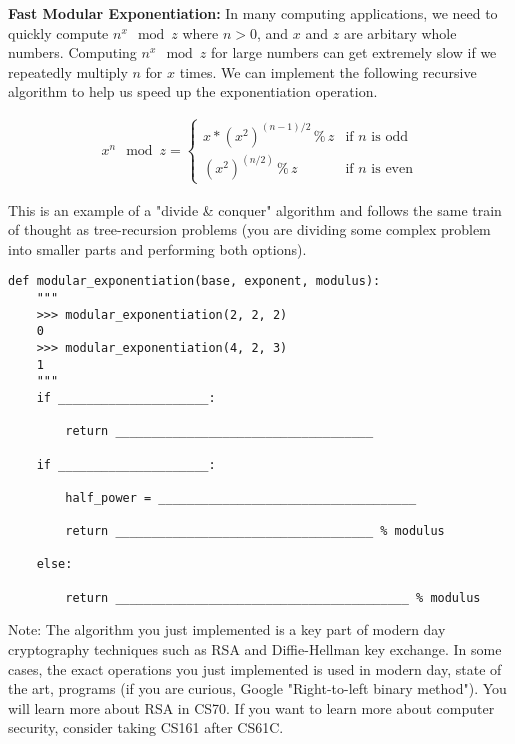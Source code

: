 \begin{blocksection}
    \question \textbf{Fast Modular Exponentiation:} In many computing applications, we need to quickly compute $n^{x} \mod z $ where $n > 0$, and $x$ and $z$ are arbitary whole numbers. Computing $n^{x} \mod z$ for large numbers can get extremely slow if we repeatedly multiply $n$ for $x$ times. We can implement the following recursive algorithm to help us speed up the exponentiation operation.

    \begin{gather*}
        x^{n} \mod z = 
        \begin{cases}
            x * (x^{2})^{(n-1)/2} \, \% \, z & \text{if $n$ is odd}\\
            (x^{2})^(n/2) \, \% \, z & \text{if $n$ is even}
        \end{cases}
    \end{gather*}

    This is an example of a "divide \& conquer" algorithm and follows the same train of thought as tree-recursion problems (you are dividing some complex problem into smaller parts and performing both options).
    
    \begin{lstlisting}
def modular_exponentiation(base, exponent, modulus):
    """
    >>> modular_exponentiation(2, 2, 2)
    0
    >>> modular_exponentiation(4, 2, 3)
    1
    """
    if _____________________:

        return ____________________________________

    if _____________________:
            
        half_power = ____________________________________

        return ____________________________________ % modulus

    else:  

        return _________________________________________ % modulus
    \end{lstlisting}

    Note: The algorithm you just implemented is a key part of modern day cryptography techniques such as RSA and Diffie-Hellman key exchange. In some cases, the exact operations you just implemented is used in modern day, state of the art, programs (if you are curious, Google "Right-to-left binary method"). You will learn more about RSA in CS70. If you want to learn more about computer security, consider taking CS161 after CS61C.
    \end{blocksection}
    
